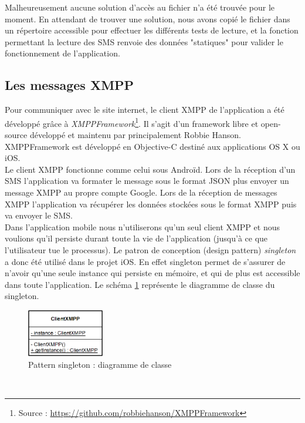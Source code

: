 Malheureusement aucune solution d'accès au fichier n'a été trouvée pour le moment.
En attendant de trouver une solution, nous avons copié le fichier dans un répertoire accessible pour effectuer les différents tests de lecture, et la fonction permettant la lecture des SMS renvoie des données "statiques" pour valider le fonctionnement de l'application.
\\




\subsection{Les messages XMPP}

Pour communiquer avec le site internet, le client XMPP de l'application a été développé grâce à \textit{XMPPFramework}\footnote{Source : \href{https://github.com/robbiehanson/XMPPFramework}{https://github.com/robbiehanson/XMPPFramework}}.
Il s'agit d'un framework libre et open-source développé et maintenu par principalement Robbie Hanson.
XMPPFramework est développé en Objective-C destiné aux applications OS X ou iOS.
\\


Le client XMPP fonctionne comme celui sous Androïd.
Lors de la réception d'un SMS l'application va formater le message sous le format JSON plus envoyer un message XMPP au propre compte Google.
Lors de la réception de messages XMPP l'application va récupérer les données stockées sous le format XMPP puis va envoyer le SMS.
\\


Dans l'application mobile nous n'utiliserons qu'un seul client XMPP et nous voulions qu'il persiste durant toute la vie de l'application (jusqu'à ce que l'utilisateur tue le processus).
Le patron de conception (design pattern) \textit{singleton} a donc été utilisé dans le projet iOS.
En effet singleton permet de s'assurer de n'avoir qu'une seule instance qui persiste en mémoire, et qui de plus est accessible dans toute l'application.
Le schéma \ref{pattern_singleton} représente le diagramme de classe du singleton.
\begin{figure}[!h]
	\center
	\includegraphics[width=0.3\textwidth]{img/pattern_singleton.png}
	\caption{Pattern singleton : diagramme de classe}
	\label{pattern_singleton}
\end{figure}
~~\\
